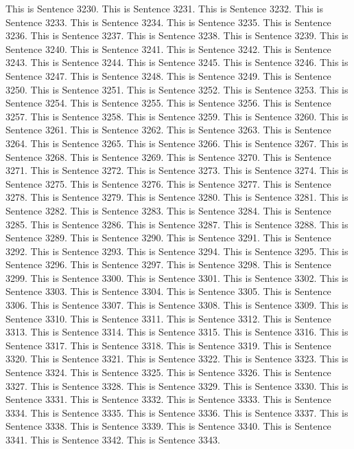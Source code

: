 \documentclass{article}
\begin{document}
This is Sentence 3230.
This is Sentence 3231.
This is Sentence 3232.
This is Sentence 3233.
This is Sentence 3234.
This is Sentence 3235.
This is Sentence 3236.
This is Sentence 3237.
This is Sentence 3238.
This is Sentence 3239.
This is Sentence 3240.
This is Sentence 3241.
This is Sentence 3242.
This is Sentence 3243.
This is Sentence 3244.
This is Sentence 3245.
This is Sentence 3246.
This is Sentence 3247.
This is Sentence 3248.
This is Sentence 3249.
This is Sentence 3250.
This is Sentence 3251.
This is Sentence 3252.
This is Sentence 3253.
This is Sentence 3254.
This is Sentence 3255.
This is Sentence 3256.
This is Sentence 3257.
This is Sentence 3258.
This is Sentence 3259.
This is Sentence 3260.
This is Sentence 3261.
This is Sentence 3262.
This is Sentence 3263.
This is Sentence 3264.
This is Sentence 3265.
This is Sentence 3266.
This is Sentence 3267.
This is Sentence 3268.
This is Sentence 3269.
This is Sentence 3270.
This is Sentence 3271.
This is Sentence 3272.
This is Sentence 3273.
This is Sentence 3274.
This is Sentence 3275.
This is Sentence 3276.
This is Sentence 3277.
This is Sentence 3278.
This is Sentence 3279.
This is Sentence 3280.
This is Sentence 3281.
This is Sentence 3282.
This is Sentence 3283.
This is Sentence 3284.
This is Sentence 3285.
This is Sentence 3286.
This is Sentence 3287.
This is Sentence 3288.
This is Sentence 3289.
This is Sentence 3290.
This is Sentence 3291.
This is Sentence 3292.
This is Sentence 3293.
This is Sentence 3294.
This is Sentence 3295.
This is Sentence 3296.
This is Sentence 3297.
This is Sentence 3298.
This is Sentence 3299.
This is Sentence 3300.
This is Sentence 3301.
This is Sentence 3302.
This is Sentence 3303.
This is Sentence 3304.
This is Sentence 3305.
This is Sentence 3306.
This is Sentence 3307.
This is Sentence 3308.
This is Sentence 3309.
This is Sentence 3310.
This is Sentence 3311.
This is Sentence 3312.
This is Sentence 3313.
This is Sentence 3314.
This is Sentence 3315.
This is Sentence 3316.
This is Sentence 3317.
This is Sentence 3318.
This is Sentence 3319.
This is Sentence 3320.
This is Sentence 3321.
This is Sentence 3322.
This is Sentence 3323.
This is Sentence 3324.
This is Sentence 3325.
This is Sentence 3326.
This is Sentence 3327.
This is Sentence 3328.
This is Sentence 3329.
This is Sentence 3330.
This is Sentence 3331.
This is Sentence 3332.
This is Sentence 3333.
This is Sentence 3334.
This is Sentence 3335.
This is Sentence 3336.
This is Sentence 3337.
This is Sentence 3338.
This is Sentence 3339.
This is Sentence 3340.
This is Sentence 3341.
This is Sentence 3342.
This is Sentence 3343.
\end{document}
